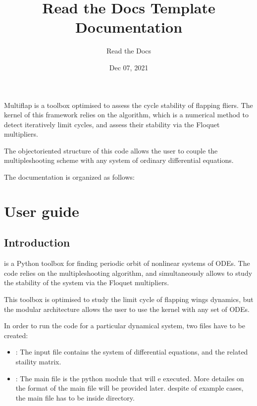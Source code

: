 \documentclass[letterpaper,10pt,english,openany,oneside]{sphinxmanual}
\title{Read the Docs Template Documentation}
\date{Dec 07, 2021}
\author{Read the Docs}
\begin{document}
\pagestyle{empty}
\sphinxmaketitle
\pagestyle{plain}
\sphinxtableofcontents
\pagestyle{normal}
\label{\detokenize{index::doc}}


Multiflap is a  toolbox optimised to assess the cycle stability of flapping fliers. The kernel of this framework relies on the  algorithm, which is a numerical method to detect iteratively limit cycles, and assess their stability via the Floquet multipliers.

The object\sphinxhyphen{}oriented structure of this code allows the user to couple the multiple\sphinxhyphen{}shooting scheme with any system of ordinary differential equations.

The documentation is organized as follows:


\chapter{User guide}
\label{\detokenize{getting_started/index:user-guide}}\label{\detokenize{getting_started/index::doc}}

\section{Introduction}
\label{\detokenize{getting_started/multiflap_guide:introduction}}\label{\detokenize{getting_started/multiflap_guide::doc}}
 is a Python toolbox for finding periodic orbit of nonlinear systems of ODEs. The code relies on the multiple\sphinxhyphen{}shooting algorithm, and simultaneously allows to study the stability of the system via the Floquet multipliers.

This toolbox is optimised to study the limit cycle of flapping wings dynamics, but the modular architecture allows the user to use the kernel with any set of ODEs.

In order to run the code for a particular dynamical system, two files have to be created:
\begin{itemize}
\item {} 
: The input file contains the system of differential equations, and the related staility matrix.

\item {} 
: The main file is the python module that will e executed. More detailes on the format of the main file will be provided later.  despite of example cases, the main file has to be inside  directory.

\end{itemize}
\end{document}
